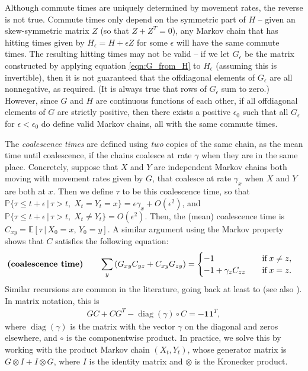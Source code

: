 \documentclass{article}
\DeclareMathOperator{\diag}{\mathop{\mbox{diag}}}
\renewcommand{\P}{\mathbb{P}}
\newcommand{\E}{\mathbb{E}}
\newcommand{\given}{\,\vert\,}
\newcommand{\bone}{\mathbf{1}}
\begin{document}
Although commute times are uniquely determined by movement rates, the reverse is not true.
Commute times only depend on the symmetric part of $H$ --
given an skew-symmetric matrix $Z$ (so that $Z + Z^T = 0$),
any Markov chain that has hitting times given by $H_\epsilon = H + \epsilon Z$ for some $\epsilon$
will have the same commute times.
The resulting hitting times may not be valid --
if we let $G_\epsilon$ be the matrix constructed by applying equation \eqref{eqn:G_from_H} to $H_\epsilon$
(assuming this is invertible),
then it is not guaranteed that the offdiagonal elements of $G_\epsilon$ are all nonnegative, as required.
(It is always true that rows of $G_\epsilon$ sum to zero.)
However, since $G$ and $H$ are continuous functions of each other,
if all offdiagonal elements of $G$ are strictly positive,
then there exists a positive $\epsilon_0$ such that all $G_\epsilon$ for $\epsilon < \epsilon_0$
do define valid Markov chains, all with the same commute times.

The \emph{coalescence times} are defined using \emph{two} copies of the same chain,
as the mean time until coalescence,
if the chains coalesce at rate $\gamma$ when they are in the same place.
Concretely, 
suppose that $X$ and $Y$ are independent Markov chains both moving with movement rates given by $G$,
that coalesce at rate $\gamma_x$ when $X$ and $Y$ are both at $x$.
Then we define $\tau$ to be this coalescence time,
so that 
$\P\{\tau \le t + \epsilon \given \tau > t, \; X_t = Y_t = x\} = \epsilon \gamma_x + O(\epsilon^2)$,
and 
$\P\{\tau \le t + \epsilon \given \tau > t, \; X_t \neq Y_t\} = O(\epsilon^2)$.
Then, the (mean) coalescence time is $C_{xy} = \E[\tau \given X_0 = x, \, Y_0 = y]$.
A similar argument using the Markov property
shows that $C$ satisfies the following equation:
\begin{align}
\text{\bf (coalescence time)} \qquad
    \sum_y \left(G_{xy} C_{yz} + C_{xy} G_{zy}\right)
    &=
    \begin{cases}
        -1                   \quad & \text{if} \; x \neq z, \\
        -1 + \gamma_z C_{zz} \quad & \text{if} \; x = z.
    \end{cases}
\end{align}
Similar recursions are common in the literature,
going back at least to \citet{hill1972effective} (see also \citet{whitlock1997effective}).
In matrix notation, this is
\begin{align} \label{eqn:C_matrix}
    G C + C G^T - \diag(\gamma) \circ C = -\bone \bone^T,
\end{align}
where $\diag(\gamma)$ is the matrix with the vector $\gamma$ on the diagonal and zeros elsewhere,
and $\circ$ is the componentwise product.
In practice, we solve this by working with the product Markov chain $(X_t, Y_t)$,
whose generator matrix is $G \otimes I + I \otimes G$,
where $I$ is the identity matrix and $\otimes$ is the Kronecker product.
\end{document}
